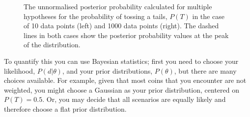 \begin{figure}
\caption[Is my coin biased? An example of the strength of Bayesian statistics]{The unnormalised posterior probability calculated for multiple hypotheses for the probability of tossing a tails, $P(T)$ in the case of 10 data points (left) and 1000 data points (right). The dashed lines in both cases show the posterior probability values at the peak of the distribution.}
\label{fig:coin}
\end{figure}

To quantify this you can use Bayesian statistics; first you need to choose your likelihood, $P(d | \theta)$, and your prior distributions, $P(\theta)$, but there are many choices available. For example, given that most coins that you encounter are not weighted, you might choose a Gaussian as your prior distribution, centered on $P(T)=0.5$. Or, you may decide that all scenarios are equally likely and therefore choose a flat prior distribution. 

